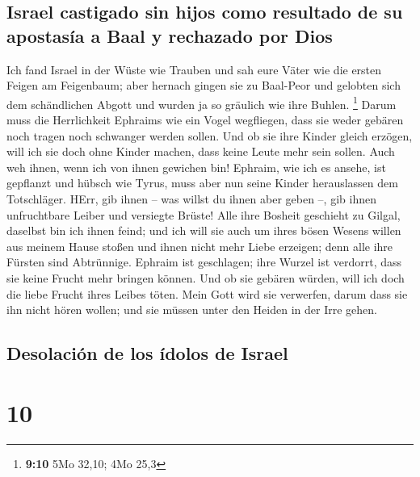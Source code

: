 \hypertarget{israel-castigado-sin-hijos-como-resultado-de-su-apostasuxeda-a-baal-y-rechazado-por-dios}{%
\subsection{Israel castigado sin hijos como resultado de su apostasía a
Baal y rechazado por
Dios}\label{israel-castigado-sin-hijos-como-resultado-de-su-apostasuxeda-a-baal-y-rechazado-por-dios}}

 Ich fand Israel in der Wüste wie Trauben und sah eure
Väter wie die ersten Feigen am Feigenbaum; aber hernach gingen sie zu
Baal-Peor und gelobten sich dem schändlichen Abgott und wurden ja so
gräulich wie ihre Buhlen. \footnote{\textbf{9:10} 5Mo 32,10; 4Mo 25,3}
 Darum muss die Herrlichkeit Ephraims wie ein Vogel
wegfliegen, dass sie weder gebären noch tragen noch schwanger werden
sollen.  Und ob sie ihre Kinder gleich erzögen, will ich
sie doch ohne Kinder machen, dass keine Leute mehr sein sollen. Auch weh
ihnen, wenn ich von ihnen gewichen bin!  Ephraim, wie ich
es ansehe, ist gepflanzt und hübsch wie Tyrus, muss aber nun seine
Kinder herauslassen dem Totschläger.  HErr, gib ihnen --
was willst du ihnen aber geben --, gib ihnen unfruchtbare Leiber und
versiegte Brüste!  Alle ihre Bosheit geschieht zu Gilgal,
daselbst bin ich ihnen feind; und ich will sie auch um ihres bösen
Wesens willen aus meinem Hause stoßen und ihnen nicht mehr Liebe
erzeigen; denn alle ihre Fürsten sind Abtrünnige. 
Ephraim ist geschlagen; ihre Wurzel ist verdorrt, dass sie keine Frucht
mehr bringen können. Und ob sie gebären würden, will ich doch die liebe
Frucht ihres Leibes töten.  Mein Gott wird sie verwerfen,
darum dass sie ihn nicht hören wollen; und sie müssen unter den Heiden
in der Irre gehen.

\hypertarget{desolaciuxf3n-de-los-uxeddolos-de-israel}{%
\subsection{Desolación de los ídolos de
Israel}\label{desolaciuxf3n-de-los-uxeddolos-de-israel}}

\hypertarget{section-9}{%
\section{10}\label{section-9}}

